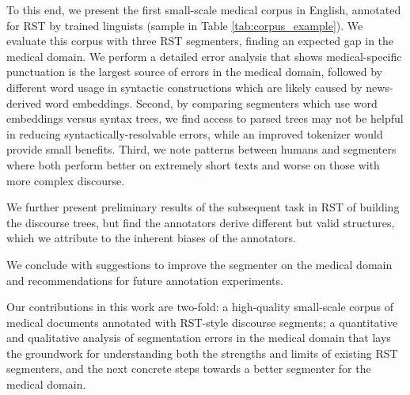 To this end, we present the first small-scale medical corpus in English, annotated for RST by trained linguists (sample in Table \ref{tab:corpus_example}). We evaluate this corpus with three RST segmenters, finding an expected gap in the medical domain. We perform a detailed error analysis that shows medical-specific punctuation is the largest source of errors in the medical domain, followed by different word usage in syntactic constructions which are likely caused by news-derived word embeddings. Second, by comparing segmenters which use word embeddings versus syntax trees, we find access to parsed trees may not be helpful in reducing syntactically-resolvable errors, while an improved tokenizer would provide small benefits. Third, we note patterns between humans and segmenters where both perform better on extremely short texts and worse on those with more complex discourse. 

We further present preliminary results of the subsequent task in RST of building the discourse trees, but find the annotators derive different but valid structures, which we attribute to the inherent biases of the annotators. 

We conclude with suggestions to improve the segmenter on the medical domain and recommendations for future annotation experiments.

Our contributions in this work are two-fold: a high-quality small-scale corpus of medical documents annotated with RST-style discourse segments; a quantitative and qualitative analysis of segmentation errors in the medical domain that lays the groundwork for understanding both the strengths and limits of existing RST segmenters, and the next concrete steps towards a better segmenter for the medical domain.

